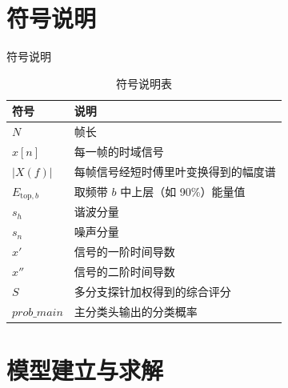 \documentclass[aspectratio=169]{beamer}
\begin{document}
\section{符号说明}

\begin{frame}{符号说明}
\small
\begin{table}[H]
\centering
\caption{符号说明表}
\begin{tabular}{ll}
\toprule
\textbf{符号} & \textbf{说明} \\
\midrule
$N$ & 帧长 \\
$x[n]$ & 每一帧的时域信号 \\
$|X(f)|$ & 每帧信号经短时傅里叶变换得到的幅度谱 \\
$E_{\mathrm{top},b}$ & 取频带 $b$ 中上层（如 90\%）能量值 \\
$s_h$ & 谐波分量 \\
$s_n$ & 噪声分量 \\
$x'$ & 信号的一阶时间导数 \\
$x''$ & 信号的二阶时间导数 \\
$S$ & 多分支探针加权得到的综合评分 \\
$prob\_main$ & 主分类头输出的分类概率 \\
\bottomrule
\end{tabular}
\end{table}
\end{frame}

\section{模型建立与求解}
\end{document}
